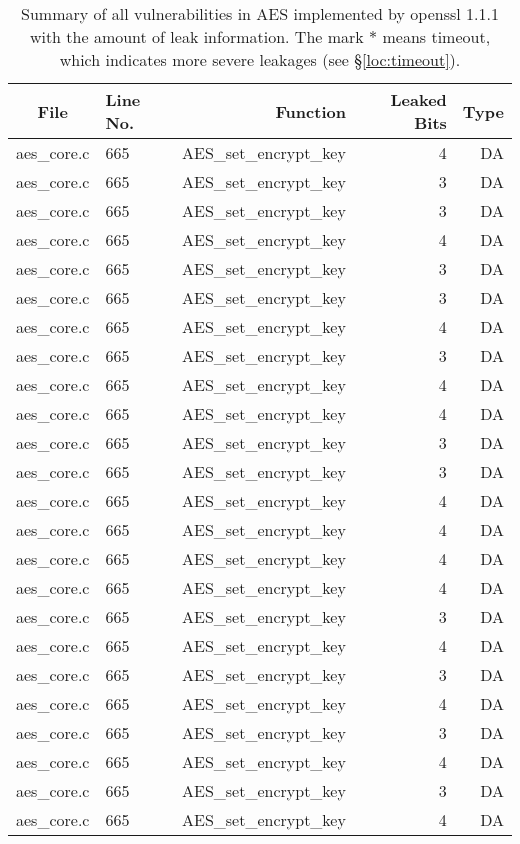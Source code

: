 \begin{table}%
\centering\tiny\scriptsize
\caption{Summary of all vulnerabilities in AES implemented by openssl 1.1.1 with the amount of leak information. The mark $*$ means timeout, which indicates more severe leakages (see \S\ref{loc:timeout}).}\label{tab:AESopenssl}
\begin{tabular}{clrrr}
\hline
\textbf{File} & \textbf{Line No.} & \textbf{Function} & \textbf{Leaked Bits} & \textbf{Type} \\\hline
aes\_core.c& 665&AES\_set\_encrypt\_key&4 &DA\\
aes\_core.c& 665&AES\_set\_encrypt\_key&3 &DA\\
aes\_core.c& 665&AES\_set\_encrypt\_key&3 &DA\\
aes\_core.c& 665&AES\_set\_encrypt\_key&4 &DA\\
aes\_core.c& 665&AES\_set\_encrypt\_key&3 &DA\\
aes\_core.c& 665&AES\_set\_encrypt\_key&3 &DA\\
aes\_core.c& 665&AES\_set\_encrypt\_key&4 &DA\\
aes\_core.c& 665&AES\_set\_encrypt\_key&3 &DA\\
aes\_core.c& 665&AES\_set\_encrypt\_key&4 &DA\\
aes\_core.c& 665&AES\_set\_encrypt\_key&4 &DA\\
aes\_core.c& 665&AES\_set\_encrypt\_key&3 &DA\\
aes\_core.c& 665&AES\_set\_encrypt\_key&3 &DA\\
aes\_core.c& 665&AES\_set\_encrypt\_key&4 &DA\\
aes\_core.c& 665&AES\_set\_encrypt\_key&4 &DA\\
aes\_core.c& 665&AES\_set\_encrypt\_key&4 &DA\\
aes\_core.c& 665&AES\_set\_encrypt\_key&4 &DA\\
aes\_core.c& 665&AES\_set\_encrypt\_key&3 &DA\\
aes\_core.c& 665&AES\_set\_encrypt\_key&4 &DA\\
aes\_core.c& 665&AES\_set\_encrypt\_key&3 &DA\\
aes\_core.c& 665&AES\_set\_encrypt\_key&4 &DA\\
aes\_core.c& 665&AES\_set\_encrypt\_key&3 &DA\\
aes\_core.c& 665&AES\_set\_encrypt\_key&4 &DA\\
aes\_core.c& 665&AES\_set\_encrypt\_key&3 &DA\\
aes\_core.c& 665&AES\_set\_encrypt\_key&4 &DA\\

\end{tabular}
\end{table}
